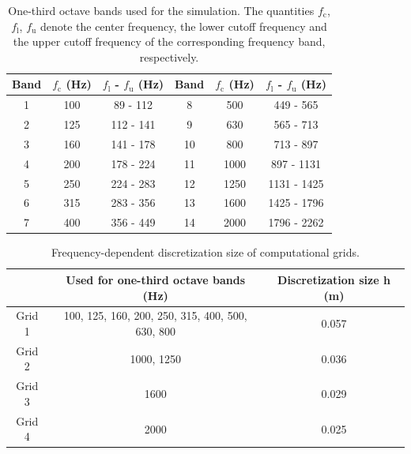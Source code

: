 \begin{table}
	\centering
	\caption{One-third octave bands used for the simulation. The quantities $f_{\text{c}}$, $f_{\text{l}}$, $f_{\text{u}}$ denote the center frequency, the lower cutoff frequency and the upper cutoff frequency of the corresponding frequency band, respectively.}
	\label{tab:third_octave_bands_used}
	\begin{tabular}{cccccc}
		\toprule
		Band & $f_{\text{c}}$ (Hz) & $f_{\text{l}}$ - $f_{\text{u}}$ (Hz) & Band & $f_{\text{c}}$ (Hz) & $f_{\text{l}}$ - $f_{\text{u}}$ (Hz) \\
		\midrule
		1 & 100 & 89 - 112 & 8 & 500 & 449 - 565 \\
		2 & 125 & 112 - 141 & 9 & 630 & 565 - 713 \\
		3 & 160 & 141 - 178 & 10 & 800 & 713 - 897 \\
		4 & 200 & 178 - 224 & 11 & 1000 & 897 - 1131 \\
		5 & 250 & 224 - 283 & 12 & 1250 & 1131 - 1425 \\
		6 & 315 & 283 - 356 & 13 & 1600 & 1425 - 1796 \\
		7 & 400 & 356 - 449 & 14 & 2000 & 1796 - 2262 \\
		\bottomrule
	\end{tabular}
\end{table}


\begin{table}
	\centering
	\caption{Frequency-dependent discretization size of computational grids.}
	\label{tab:grid_size}
	\begin{tabular}{ccc}
		\toprule
			& Used for one-third octave bands (Hz) & Discretization size h (m) \\
		\midrule
		Grid 1 & 100, 125, 160, 200, 250, 315, 400, 500, 630, 800 & 0.057 \\
		Grid 2 & 1000, 1250 & 0.036 \\
		Grid 3 & 1600 & 0.029 \\
		Grid 4 & 2000 & 0.025 \\
		\bottomrule
	\end{tabular}
\end{table}



